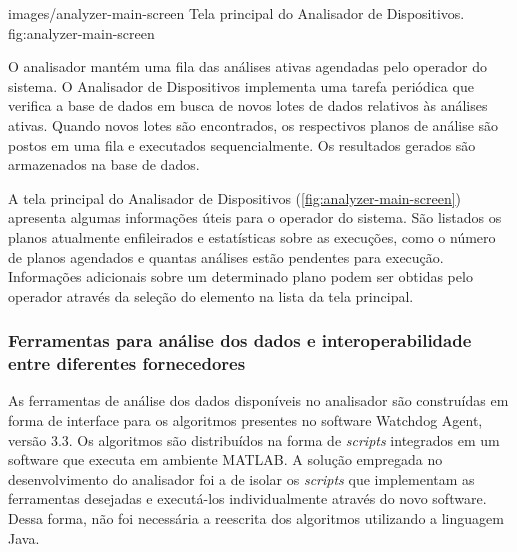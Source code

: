   {images/analyzer-main-screen}
  {Tela principal do Analisador de Dispositivos.}
  {fig:analyzer-main-screen}

O analisador mantém uma fila das análises ativas agendadas pelo operador do sistema. O Analisador de
Dispositivos implementa uma tarefa periódica que verifica a base de dados em busca de novos lotes de
dados relativos às análises ativas. Quando novos lotes são encontrados, os respectivos planos de
análise são postos em uma fila e executados sequencialmente. Os resultados gerados são armazenados
na base de dados.

A tela principal do Analisador de Dispositivos (\cref{fig:analyzer-main-screen}) apresenta algumas
informações úteis para o operador do sistema. São listados os planos atualmente enfileirados e
estatísticas sobre as execuções, como o número de planos agendados e quantas análises estão
pendentes para execução. Informações adicionais sobre um determinado plano podem ser obtidas pelo
operador através da seleção do elemento na lista da tela principal.


\subsubsection{Ferramentas para análise dos dados e interoperabilidade entre diferentes
    fornecedores}

As ferramentas de análise dos dados disponíveis no analisador são construídas em forma de interface
para os algoritmos presentes no software Watchdog Agent, versão 3.3.
Os algoritmos são distribuídos na forma de \textit{scripts} integrados em um software que executa em
ambiente MATLAB. A solução empregada no desenvolvimento do analisador foi a de isolar os
\textit{scripts} que implementam as ferramentas desejadas e executá-los individualmente através do
novo software. Dessa forma, não foi necessária a reescrita dos algoritmos utilizando a linguagem
Java.

